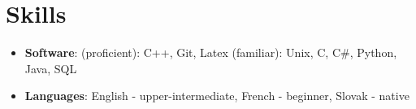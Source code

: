 \documentclass[letterpaper,11pt]{article}
\newcommand{\resumeSubHeadingListStart}{\begin{itemize}[leftmargin=*]}
\newcommand{\resumeSubHeadingListEnd}{\end{itemize}}
\begin{document}
%
\section{Skills}
 \resumeSubHeadingListStart
   \item{
     \textbf{Software}{: (proficient): C++, Git, Latex (familiar): Unix, C, C\#, Python, Java, SQL}
     \hfill
   }\item{
    \textbf{Languages}{: English - upper-intermediate, French - beginner, Slovak - native}
    }
 \resumeSubHeadingListEnd


\end{document}
